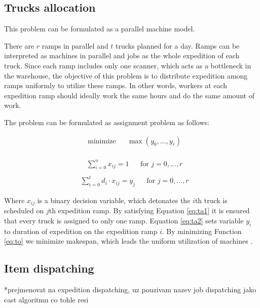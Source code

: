 \documentclass{ctuthesis}
\begin{document}
 \subsection{Trucks allocation}
 \label{subsec:truckallocation}
This problem can be formulated as a parallel machine model.
 
 There are $r$ ramps in parallel and $t$ trucks planned for a day. Ramps can be interpreted as machines in parallel and jobs as the whole expedition of each truck. Since each ramp includes only one scanner, which acts as a bottleneck in the warehouse, the objective of this problem is to distribute expedition among ramps uniformly to utilize these ramps. In other words, workers at each expedition ramp should ideally work the same hours and do the same amount of work. 
 

 
 The problem can be formulated as assignment problem as follows:
 
 \begin{equation}\label{eq:to}
\begin{aligned}
&\text{minimize}
&&\max(y_0, \ldots, y_r)
\end{aligned}
\end{equation}
\\
\begin{equation} \label{eq:ta1}
\begin{aligned}
    & \sum_{i=0}^{n} x_{ij} = 1 && \text{for } j=0, \ldots, r\\
\end{aligned}
\end{equation}
\begin{equation} \label{eq:ta2}
\begin{aligned}
    & \sum_{i=0}^{t} {d_i} \cdot x_{ij} = y_j && \text{for } j=0, \ldots, r
\end{aligned}
\end{equation}
  
Where $x_{ij}$ is a binary decision variable, which detonates the $i$th truck is scheduled on $j$th expedition ramp. By satisfying Equation \ref{eq:ta1} it is ensured that every truck is assigned to only one ramp. Equation \ref{eq:ta2} sets variable $y_i$ to duration of expedition on the expedition ramp $i$. By minimizing Function \ref{eq:to} we minimize makespan, which leads the uniform utilization of machines \cite{pinedo}.

 
\subsection{Item dispatching}*prejmenovat na expedition dispatching, uz pouzivam nazev job dispatching jako cast algoritmu co tohle resi
\label{subsec:expeditiondispatching}
\end{document}
